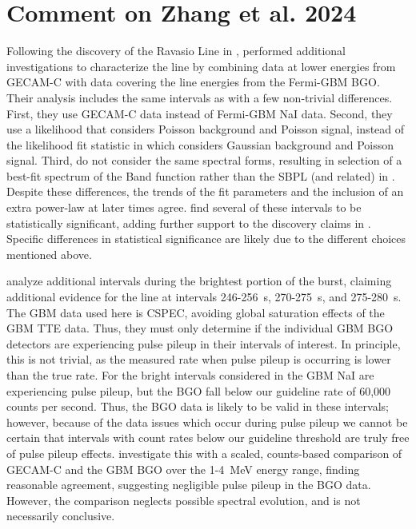 \documentclass{aastex61}
\begin{document}
\section{Comment on Zhang et al. 2024}
Following the discovery of the Ravasio Line in \citet{ravasio2024mega}, \citet{zhang2024observation} performed additional investigations to characterize the line by combining data at lower energies from GECAM-C with data covering the line energies from the Fermi-GBM BGO. Their analysis includes the same intervals as \citet{ravasio2024mega} with a few non-trivial differences. First, they use GECAM-C data instead of Fermi-GBM NaI data. Second, they use a likelihood that considers Poisson background and Poisson signal, instead of the likelihood fit statistic in \citet{ravasio2024mega} which considers Gaussian background and Poisson signal. Third, \citet{zhang2024observation} do not consider the same spectral forms, resulting in selection of a best-fit spectrum of the Band function \citep{1993ApJ...413..281B} rather than the SBPL (and related) in \citet{ravasio2024mega}. Despite these differences, the trends of the fit parameters and the inclusion of an extra power-law at later times agree. \citet{zhang2024observation} find several of these intervals to be statistically significant, adding further support to the discovery claims in \citet{ravasio2024mega}. Specific differences in statistical significance are likely due to the different choices mentioned above.

\citet{zhang2024observation} analyze additional intervals during the brightest portion of the burst, claiming additional evidence for the line at intervals 246-256~s, 270-275~s, and 275-280~s. The GBM data used here is CSPEC, avoiding global saturation effects of the GBM TTE data. Thus, they must only determine if the individual GBM BGO detectors are experiencing pulse pileup in their intervals of interest. In principle, this is not trivial, as the measured rate when pulse pileup is occurring is lower than the true rate. For the bright intervals considered in \citet{zhang2024observation} the GBM NaI are experiencing pulse pileup, but the BGO fall below our guideline rate of 60,000 counts per second. Thus, the BGO data is likely to be valid in these intervals; however, because of the data issues which occur during pulse pileup we cannot be certain that intervals with count rates below our guideline threshold are truly free of pulse pileup effects. \citet{zhang2024observation} investigate this with a scaled, counts-based comparison of GECAM-C and the GBM BGO over the 1-4~MeV energy range, finding reasonable agreement, suggesting negligible pulse pileup in the BGO data. However, the comparison neglects possible spectral evolution, and is not necessarily conclusive.
\end{document}
